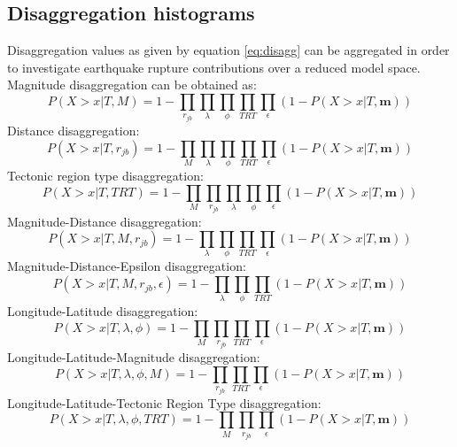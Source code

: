\subsection{Disaggregation histograms}
Disaggregation values as given by equation \ref{eq:disagg} can be aggregated in order to investigate earthquake rupture
contributions over a reduced model space.\\
Magnitude disaggregation can be obtained as:
\begin{equation}
P(X > x | T, M) = 1 -\prod_{r_{jb}}\prod_{\lambda}\prod_{\phi}\prod_{TRT} \prod_{\epsilon}(1 - P(X > x | T, \bm{m}))
\end{equation}
Distance disaggregation:
\begin{equation}
P(X > x | T, r_{jb}) = 1 -\prod_{M}\prod_{\lambda}\prod_{\phi}\prod_{TRT} \prod_{\epsilon}(1 - P(X > x | T, \bm{m}))
\end{equation}
Tectonic region type disaggregation:
\begin{equation}
P(X > x | T, TRT) = 1 -\prod_{M}\prod_{r_{jb}}\prod_{\lambda}\prod_{\phi} \prod_{\epsilon}(1 - P(X > x | T, \bm{m}))
\end{equation}
Magnitude-Distance disaggregation:
\begin{equation}
P(X > x | T, M, r_{jb}) = 1 -\prod_{\lambda}\prod_{\phi}\prod_{TRT}\prod_{\epsilon}(1 - P(X > x | T, \bm{m}))
\end{equation}
Magnitude-Distance-Epsilon disaggregation:
\begin{equation}
P(X > x | T, M, r_{jb}, \epsilon) = 1 -\prod_{\lambda}\prod_{\phi}\prod_{TRT}(1 - P(X > x | T, \bm{m}))
\end{equation}
Longitude-Latitude disaggregation:
\begin{equation}
P(X > x | T, \lambda, \phi) = 1 -\prod_{M}\prod_{r_{jb}}\prod_{TRT}\prod_{\epsilon}(1 - P(X > x | T, \bm{m}))
\end{equation}
Longitude-Latitude-Magnitude disaggregation:
\begin{equation}
P(X > x | T, \lambda, \phi, M) = 1 -\prod_{r_{jb}}\prod_{TRT}\prod_{\epsilon}(1 - P(X > x | T, \bm{m}))
\end{equation}
Longitude-Latitude-Tectonic Region Type disaggregation:
\begin{equation}
P(X > x | T, \lambda, \phi, TRT) = 1 -\prod_{M}\prod_{r_{jb}}\prod_{\epsilon}(1 - P(X > x | T, \bm{m}))
\end{equation}


